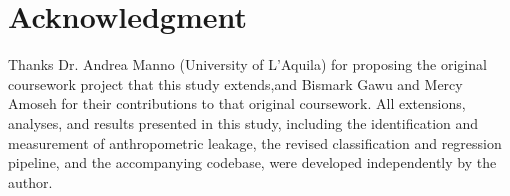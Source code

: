 \documentclass[journal]{IEEEtran}
\begin{document}
\section*{Acknowledgment}
Thanks Dr. Andrea Manno (University of L'Aquila) for proposing the original coursework project that this study extends,and Bismark Gawu and Mercy Amoseh for their contributions to that original coursework. All extensions, analyses, and results presented in this study, including the identification and measurement of anthropometric leakage, the revised classification and regression pipeline, and the accompanying codebase, were developed independently by the author.



\end{document}
